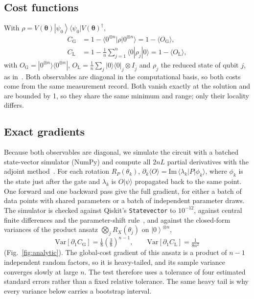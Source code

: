 \documentclass[conference]{IEEEtran}
\providecommand{\ket}[1]{\left|#1\right\rangle}
\newcommand{\Var}{\mathrm{Var}}
\newcommand{\CG}{C_{\mathrm{G}}}
\newcommand{\CL}{C_{\mathrm{L}}}
\begin{document}
\subsection{Cost functions}
With $\rho=V(\boldsymbol\theta)\ket{\psi_0}\!\langle\psi_0|V(\boldsymbol\theta)^\dagger$,
\begin{align}
\CG &= 1-\langle 0^{\otimes n}|\rho|0^{\otimes n}\rangle = 1-\langle O_{\mathrm G}\rangle,\\
\CL &= 1-\tfrac{1}{n}\textstyle\sum_{j=1}^{n}\langle 0|\rho_j|0\rangle = 1-\langle O_{\mathrm L}\rangle,
\end{align}
with $O_{\mathrm G}=|0^{\otimes n}\rangle\langle 0^{\otimes n}|$,
$O_{\mathrm L}=\frac1n\sum_j |0\rangle\langle 0|_j\otimes I_{\bar j}$ and
$\rho_j$ the reduced state of qubit $j$, as in~\cite{cerezo2021}. Both
observables are diagonal in the computational basis, so both costs come from the same
measurement record. Both vanish exactly at the solution and are bounded by 1,
so they share the same minimum and range; only their locality differs.

\subsection{Exact gradients}
Because both observables are diagonal, we simulate the circuit with a batched
state-vector simulator (NumPy) and compute all $2nL$ partial derivatives with
the adjoint method~\cite{jones2020}. For each rotation $R_P(\theta_k)$,
$\partial_k\langle O\rangle = \mathrm{Im}\,\langle\lambda_k|P|\phi_k\rangle$,
where $\phi_k$ is the state just after the gate and $\lambda_k$ is $O|\psi\rangle$
propagated back to the same point. One forward and one backward pass give
the full gradient, for either a batch of data points with shared parameters or
a batch of independent parameter draws. The simulator is checked against
Qiskit's \texttt{Statevector} to $10^{-12}$, against central finite differences
and the parameter-shift rule~\cite{schuld2019}, and against the closed-form
variances of the product ansatz $\bigotimes_j R_X(\theta_j)$ on
$\ket{0}^{\otimes n}$,
\begin{equation}
\Var[\partial_1\CG]=\tfrac18\left(\tfrac38\right)^{n-1},\qquad
\Var[\partial_1\CL]=\tfrac{1}{8n^2}
\end{equation}
(Fig.~\ref{fig:analytic}). The global-cost gradient of this ansatz is a product
of $n-1$ independent random factors, so it is heavy-tailed, and its sample
variance converges slowly at large $n$. The test therefore uses a tolerance of
four estimated standard errors rather than a fixed relative tolerance. The same
heavy tail is why every variance below carries a bootstrap interval.
\end{document}
